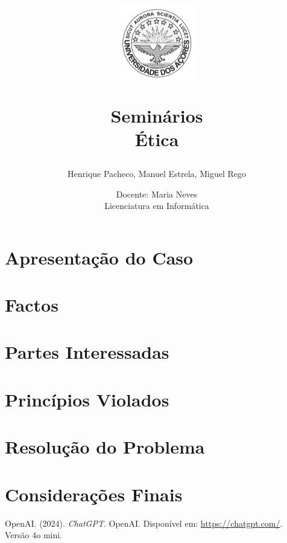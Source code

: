 \documentclass[a4paper,12pt]{article}
\title{
    \vspace{-1cm} 
    \begin{figure}[H]
        \centering
        \includegraphics[width=0.3\textwidth]{./images/uac_logo.png}
    \end{figure}
    \vspace{0.5cm} 
    \textbf{Seminários}
    \\
    Ética
}
\author{Henrique Pacheco, Manuel Estrela, Miguel Rego}
\date{Docente: Maria Neves \\ \vspace{0.5cm}Licenciatura em Informática }
\begin{document}
\maketitle

\begin{abstract}

\end{abstract}

\newpage

\section{Apresentação do Caso}
\section{Factos}


\section{Partes Interessadas}


\section{Princípios Violados}

\section{Resolução do Problema}


\section{Considerações Finais}


\begin{thebibliography}{10}
        OpenAI. (2024). \textit{ChatGPT}. OpenAI. Disponível em: \url{https://chatgpt.com/}. Versão 4o mini.


\end{thebibliography}
\end{document}
